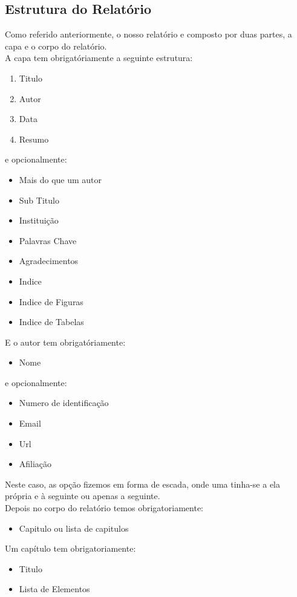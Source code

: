 \documentclass[11pt, a4paper]{report}
\begin{document}
\subsection{Estrutura do Relatório}
Como referido anteriormente, o nosso relatório e composto por duas partes, a capa e o corpo do relatório.\\
A capa tem obrigatóriamente a seguinte estrutura:\\
\begin{enumerate}
\item Titulo
\item Autor
\item Data
\item Resumo
\end{enumerate}
e opcionalmente:\\
\begin{itemize}
\item Mais do que um autor
\item Sub Titulo
\item Instituição
\item Palavras Chave
\item Agradecimentos
\item Indice
\item Indice de Figuras
\item Indice de Tabelas
\end{itemize}
E o autor tem obrigatóriamente:\\
\begin{itemize}
\item Nome
\end{itemize}
e opcionalmente:\\
\begin{itemize}
\item Numero de identificação
\item Email
\item Url
\item Afiliação
\end{itemize}
Neste caso, as opção fizemos em forma de escada, onde uma tinha-se a ela própria e à seguinte ou apenas a seguinte.\\
Depois no corpo do relatório temos obrigatoriamente:\\
\begin{itemize}
\item Capitulo ou lista de capitulos
\end{itemize}
Um capítulo tem obrigatoriamente:\\
\begin{itemize}
\item Titulo
\item Lista de Elementos
\end{itemize}
\end{document}
